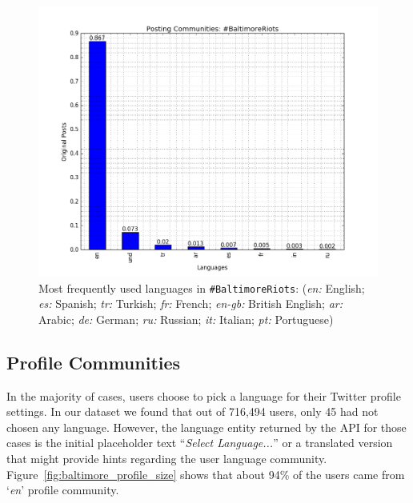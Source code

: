 \begin{figure}[htb]
\centering
\includegraphics[width=\columnwidth]{images/baltimore_langfreq.png}
\caption{Most frequently used languages in
  {\texttt{\#BaltimoreRiots}}: 
({\emph{en:}} English; {\emph{es:}} Spanish; {\emph{tr:}} Turkish;
  {\emph{fr:}} French; {\emph{en-gb:}} British English; {\emph{ar:}}
  Arabic; {\emph{de:}} German; {\emph{ru:}} Russian; {\emph{it:}}
  Italian; {\emph{pt:}} Portuguese)}
\label{fig:baltimore_langfreq}
\end{figure}

\subsection{Profile Communities}

In the majority of cases, users choose to pick a language for their
Twitter profile settings. In our dataset we found that out of 716,494
users, only 45 had not chosen any language. However, the language
entity returned by the API for those cases is the initial placeholder
text ``{\emph{Select Language...}}'' or a translated version that might provide
hints regarding the user language
community. Figure~\ref{fig:baltimore_profile_size} shows that about 94\% of the
users came from `{\emph{en}}' profile community.

